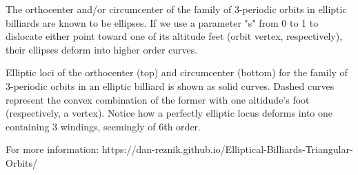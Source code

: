 The orthocenter and/or circumcenter of the family of 3-periodic orbits in elliptic billiards are known to be ellipses. If we use a parameter "s" from 0 to 1 to dislocate either point toward one of its altitude feet (orbit vertex, respectively), their ellipses deform into higher order curves.

Elliptic loci of the orthocenter (top) and circumcenter (bottom) for the family of 3-periodic orbits in an elliptic billiard is shown as solid curves. Dashed curves represent the convex combination of the former with one altidude's foot (respectively, a vertex). Notice how a perfectly elliptic locus deforms into one containing 3 windings, seemingly of 6th order.

For more information: https://dan-reznik.github.io/Elliptical-Billiards-Triangular-Orbits/